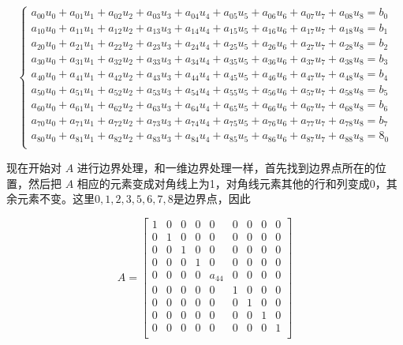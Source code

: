 \documentclass[12pt,a4paper]{article}
\begin{document}
$$
\begin{cases}
a_{00}u_0 + a_{01}u_1 + a_{02}u_2 + a_{03}u_3 + a_{04}u_{4} + a_{05}u_5 + a_{06}u_6 + a_{07}u_7 + a_{08}u_8=b_0 \\
a_{10}u_0 + a_{11}u_1 + a_{12}u_2 + a_{13}u_3 + a_{14}u_{4} + a_{15}u_5 + a_{16}u_6 + a_{17}u_7 + a_{18}u_8=b_1 \\
a_{20}u_0 + a_{21}u_1 + a_{22}u_2 + a_{23}u_3 + a_{24}u_{4} + a_{25}u_5 + a_{26}u_6 + a_{27}u_7 + a_{28}u_8=b_2 \\
a_{30}u_0 + a_{31}u_1 + a_{32}u_2 + a_{33}u_3 + a_{34}u_{4} + a_{35}u_5 + a_{36}u_6 + a_{37}u_7 + a_{38}u_8=b_3 \\
a_{40}u_0 + a_{41}u_1 + a_{42}u_2 + a_{43}u_3 + a_{44}u_{4} + a_{45}u_5 + a_{46}u_6 + a_{47}u_7 + a_{48}u_8=b_4 \\
a_{50}u_0 + a_{51}u_1 + a_{52}u_2 + a_{53}u_3 + a_{54}u_{4} + a_{55}u_5 + a_{56}u_6 + a_{57}u_7 + a_{58}u_8=b_5 \\
a_{60}u_0 + a_{61}u_1 + a_{62}u_2 + a_{63}u_3 + a_{64}u_{4} + a_{65}u_5 + a_{66}u_6 + a_{67}u_7 + a_{68}u_8=b_6 \\
a_{70}u_0 + a_{71}u_1 + a_{72}u_2 + a_{73}u_3 + a_{74}u_{4} + a_{75}u_5 + a_{76}u_6 + a_{77}u_7 + a_{78}u_8=b_7 \\
a_{80}u_0 + a_{81}u_1 + a_{82}u_2 + a_{83}u_3 + a_{84}u_{4} + a_{85}u_5 + a_{86}u_6 + a_{87}u_7 + a_{88}u_8=8_0 \\
\end{cases}
$$

现在开始对 $A$ 进行边界处理，和一维边界处理一样，首先找到边界点所在的位置，然后把 $A$ 相应的元素变成对角线上为1，对角线元素其他的行和列变成0，其余元素不变。这里$0,1,2,3,5,6,7,8$是边界点，因此

$$
A=\begin{bmatrix}
1 & 0 & 0 & 0 & 0 & 0 & 0 & 0 & 0 \\
0 & 1 & 0 & 0 & 0 & 0 & 0 & 0 & 0 \\
0 & 0 & 1 & 0 & 0 & 0 & 0 & 0 & 0 \\
0 & 0 & 0 & 1 & 0 & 0 & 0 & 0 & 0 \\
0 & 0 & 0 & 0 & a_{44} & 0 & 0 & 0 & 0\\
0 & 0 & 0 & 0 & 0 & 1 & 0 & 0 & 0\\
0 & 0 & 0 & 0 & 0 & 0 & 1 & 0 & 0 \\
0 & 0 & 0 & 0 & 0 & 0 & 0 & 1 & 0 \\
0 & 0 & 0 & 0 & 0 & 0 & 0 & 0 & 1 \\
\end{bmatrix}
$$
\end{document}
